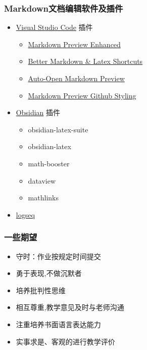 \begin{frame}
	\frametitle{{\rm Markdown}文档编辑软件及插件}
	\begin{itemize}[<+-|alert@+>]
			\item \href{https://code.visualstudio.com/}{\rm Visual Studio Code} 插件
		{\rm 	\begin{itemize}[<+-|alert@+>]
			\item \href{https://shd101wyy.github.io/markdown-preview-enhanced/\#/zh-cn/}{Markdown Preview Enhanced}
            \item \href{https://marketplace.visualstudio.com/items?itemName=OrangeX4.better-markdown-latex-shortcuts}{Better Markdown \& Latex Shortcuts}
            \item \href{https://marketplace.visualstudio.com/items?itemName=hnw.vscode-auto-open-markdown-preview}{Auto-Open Markdown Preview}
            \item \href{https://marketplace.visualstudio.com/items?itemName=bierner.markdown-preview-github-styles}{Markdown Preview Github Styling}
	       \end{itemize}}
            \item \href{https://obsidian.md/}{\rm Obsidian} 插件
           \begin{itemize}[<+-|alert@+>]
			\item  \rm obsidian-latex-suite
			\item  \rm obsidian-latex
			\item  \rm math-booster
			\item  \rm dataview
			\item  \rm mathlinks
	       \end{itemize}
       \item \href{https://logseq.com/}{\rm logseq}
	\end{itemize}
\end{frame}

\begin{frame}
	\frametitle{一些期望}
	\begin{itemize}[<+-|alert@+>]
		\item 守时：作业按规定时间提交
		\item  勇于表现,不做沉默者
		\item  培养批判性思维
		\item 相互尊重,教学意见及时与老师沟通
		\item 注重培养书面语言表达能力
		\item 实事求是、客观的进行教学评价
	\end{itemize}
\end{frame}

